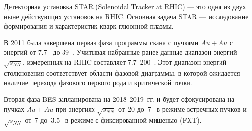 Детекторная установка STAR (Solenoidal Tracker at RHIC) --- это одна из двух ныне действующих установок на RHIC. Основная задача STAR --- исследование формирования и характеристик кварк-глюонной плазмы.



В 2011 была завершена первая фаза программы скана с пучками $Au+Au$ с энергий от 7.7~\GeVperNucl{} до 39~\GeVperNucl. Учитывая набранные ранее данные диапазон энергий $\sqrt{s_{NN}}$, измеренных на RHIC составляет 7.7--200~\GeVperNucl. Этот диапазон энергий столкновения соответствует области фазовой диаграммы, в которой ожидается наличие перехода фазового первого рода и критической точки.


Вторая фаза BES запланирована на 2018--2019~гг. и будет сфокусирована на пучках $Au+Au$ при энергиях $\sqrt{s_{NN}}$ от~20 до~7~\GeVperNucl{} в режиме встречных пучков и $\sqrt{s_{NN}}$ от~7 до~3.5~\GeVperNucl{} в режиме с фиксированной мишенью (FXT).





